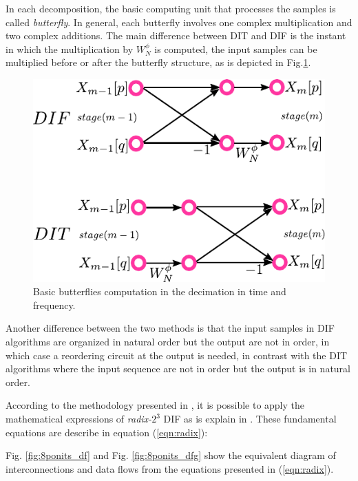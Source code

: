 \documentclass[10pt,times,mathptm,psfig,final,journal,comsoc]{IEEEtran}
\begin{document}
In each decomposition, the basic computing unit that processes the samples is called \textit{butterfly}. In general, each butterfly involves one complex multiplication and two complex additions. The main difference between DIT and DIF is the instant in which the multiplication by $W_N^\phi$ is computed, the input samples can be multiplied before or after the butterfly structure, as is depicted in Fig.\ref{fig:difdit}.

\begin{figure} [ht!]
	\centering
	\includegraphics[width=0.65\linewidth]{Diagramas/miSeccionFiguras/DifDit.pdf}
	\caption{Basic butterflies computation in the decimation in time and frequency.}
	\label{fig:difdit}
\end{figure}

Another difference between the two methods is that the input samples in DIF algorithms are organized in natural order but the output are not in order, in which case a reordering circuit at the output is needed, in contrast with the DIT algorithms where the input sequence are not in order but the output is in natural order.

According to the methodology presented in \cite{proakis_digital_nodate}, it is possible to apply the mathematical expressions of \textit{radix-}$2^3$ DIF as is explain in \cite{jia_efficient_nodate}. These fundamental equations are describe in equation (\ref{eqn:radix}):

\begingroup
\allowdisplaybreaks
\begin{small}

\end{small}
\endgroup


Fig. \ref{fig:8ponits_df} and Fig. \ref{fig:8ponits_dfg} show the equivalent diagram of interconnections and data flows from the equations presented in (\ref{eqn:radix}).

\end{document}

